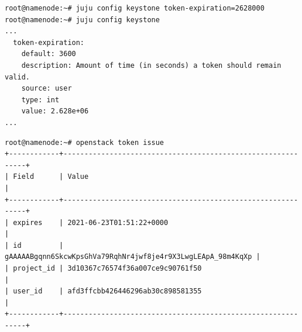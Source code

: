 \documentclass[11pt,a4paper]{article}
\begin{document}
\begin{lstlisting}[]
root@namenode:~# juju config keystone token-expiration=2628000
root@namenode:~# juju config keystone
...
  token-expiration:
    default: 3600
    description: Amount of time (in seconds) a token should remain valid.
    source: user
    type: int
    value: 2.628e+06
...
\end{lstlisting}
\begin{lstlisting}[]
root@namenode:~# openstack token issue
+------------+-------------------------------------------------------------+
| Field      | Value                                                       |
+------------+-------------------------------------------------------------+
| expires    | 2021-06-23T01:51:22+0000                                    |
| id         | gAAAAABgqnn6SkcwKpsGhVa79RqhNr4jwf8je4r9X3LwgLEApA_98m4KqXp |
| project_id | 3d10367c76574f36a007ce9c90761f50                            |
| user_id    | afd3ffcbb426446296ab30c898581355                            |
+------------+-------------------------------------------------------------+
\end{lstlisting}
\end{document}

